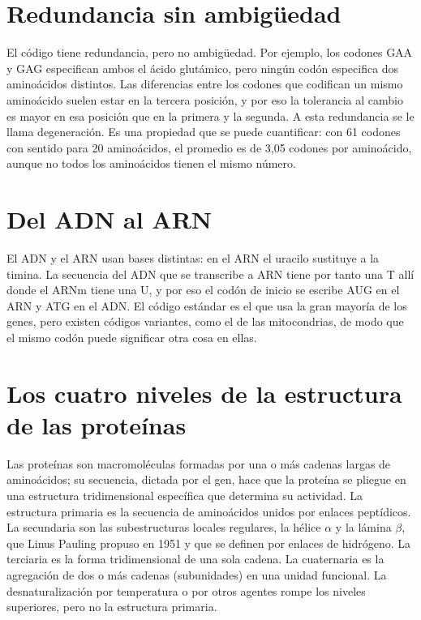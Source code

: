 \documentclass{book}
\begin{document}

\section{Redundancia sin ambigüedad}

El código tiene redundancia, pero no ambigüedad. Por ejemplo, los codones GAA y GAG especifican ambos el ácido glutámico, pero ningún codón especifica dos aminoácidos distintos. Las diferencias entre los codones que codifican un mismo aminoácido suelen estar en la tercera posición, y por eso la tolerancia al cambio es mayor en esa posición que en la primera y la segunda. A esta redundancia se le llama degeneración. Es una propiedad que se puede cuantificar: con 61 codones con sentido para 20 aminoácidos, el promedio es de 3,05 codones por aminoácido, aunque no todos los aminoácidos tienen el mismo número.


\section{Del ADN al ARN}

El ADN y el ARN usan bases distintas: en el ARN el uracilo sustituye a la timina. La secuencia del ADN que se transcribe a ARN tiene por tanto una T allí donde el ARNm tiene una U, y por eso el codón de inicio se escribe AUG en el ARN y ATG en el ADN. El código estándar es el que usa la gran mayoría de los genes, pero existen códigos variantes, como el de las mitocondrias, de modo que el mismo codón puede significar otra cosa en ellas.


\section{Los cuatro niveles de la estructura de las proteínas}

Las proteínas son macromoléculas formadas por una o más cadenas largas de aminoácidos; su secuencia, dictada por el gen, hace que la proteína se pliegue en una estructura tridimensional específica que determina su actividad. La estructura primaria es la secuencia de aminoácidos unidos por enlaces peptídicos. La secundaria son las subestructuras locales regulares, la hélice \(\alpha\) y la lámina \(\beta\), que Linus Pauling propuso en 1951 y que se definen por enlaces de hidrógeno. La terciaria es la forma tridimensional de una sola cadena. La cuaternaria es la agregación de dos o más cadenas (subunidades) en una unidad funcional. La desnaturalización por temperatura o por otros agentes rompe los niveles superiores, pero no la estructura primaria.
\end{document}
